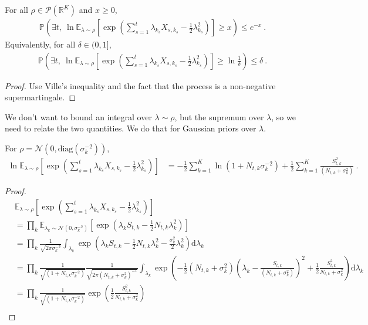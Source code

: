 \begin{corollary}\label{cor:prob_exists_log_ge_le}
For all $\rho \in \mathcal P(\mathbb{R}^K)$ and $x \ge 0$,
\begin{align*}
\mathbb{P}\left(\exists t, \ \ln \mathbb{E}_{\lambda \sim \rho}\left[\exp\left(\sum_{s=1}^t \lambda_{k_s}X_{s,k_s} - \frac{1}{2}\lambda_{k_s}^2\right)\right] \ge x\right) \le e^{-x}
\: .
\end{align*}
Equivalently, for all $\delta \in (0,1]$,
\begin{align*}
\mathbb{P}\left(\exists t, \ \ln \mathbb{E}_{\lambda \sim \rho}\left[\exp\left(\sum_{s=1}^t \lambda_{k_s}X_{s,k_s} - \frac{1}{2}\lambda_{k_s}^2\right)\right] \ge \ln\frac{1}{\delta}\right) \le \delta
\: .
\end{align*}
\end{corollary}

\begin{proof}
Use Ville's inequality and the fact that the process is a non-negative supermartingale.
\end{proof}

We don't want to bound an integral over $\lambda \sim \rho$, but the supremum over $\lambda$, so we need to relate the two quantities.
We do that for Gaussian priors over $\lambda$.

\begin{lemma}\label{lem:integral_exp_eq_log_add}
For $\rho = \mathcal N(0, \mathrm{diag}(\sigma_k^{-2}))$,
\begin{align*}
\ln \mathbb{E}_{\lambda \sim \rho}\left[\exp\left(\sum_{s=1}^t \lambda_{k_s}X_{s,k_s} - \frac{1}{2}\lambda_{k_s}^2\right)\right]
&= -\frac{1}{2}\sum_{k=1}^K \ln(1 + N_{t,k}\sigma_k^{-2}) + \frac{1}{2} \sum_{k=1}^K \frac{S_{t,k}^2}{(N_{t,k} + \sigma_k^2)}
\: .
\end{align*}
\end{lemma}

\begin{proof}
\begin{align*}
&\mathbb{E}_{\lambda \sim \rho}\left[\exp\left(\sum_{s=1}^t \lambda_{k_s}X_{s,k_s} - \frac{1}{2}\lambda_{k_s}^2\right)\right]
\\
&= \prod_k \mathbb{E}_{\lambda_k \sim \mathcal N(0, \sigma_k^{-2})}\left[\exp\left(\lambda_k S_{t,k} - \frac{1}{2}N_{t,k} \lambda_k^2\right)\right]
\\
&= \prod_k \frac{1}{\sqrt{2 \pi \sigma_k^{-2}}}\int_{\lambda_k}\exp\left(\lambda_k S_{t,k} - \frac{1}{2}N_{t,k} \lambda_k^2 - \frac{\sigma_k^2}{2}\lambda_k^2\right)\mathrm{d}\lambda_k
\\ 
&= \prod_k \frac{1}{\sqrt{(1 + N_{t,k}\sigma_k^{-2})}} \frac{1}{\sqrt{2 \pi (N_{t,k} + \sigma_k^2)^{-1}}}
  \int_{\lambda_k} \exp\left(-\frac{1}{2}(N_{t,k} + \sigma_k^2)\left( \lambda_k - \frac{S_{t,k}}{(N_{t,k} + \sigma_k^2)} \right)^2 + \frac{1}{2}\frac{S_{t,k}^2}{N_{t,k} + \sigma_k^2}\right)\mathrm{d}\lambda_k
\\
&= \prod_k \frac{1}{\sqrt{(1 + N_{t,k}\sigma_k^{-2})}} \exp\left(\frac{1}{2}\frac{S_{t,k}^2}{N_{t,k} + \sigma_k^2}\right)
\\ 
\end{align*}

\end{proof}

